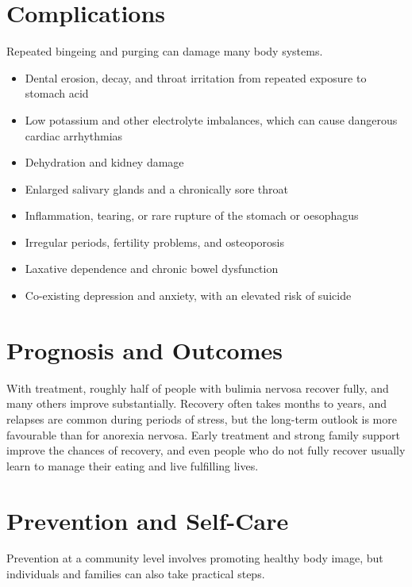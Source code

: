 \section*{Complications}
Repeated bingeing and purging can damage many body systems.

\begin{itemize}
    \item Dental erosion, decay, and throat irritation from repeated exposure to stomach acid
    \item Low potassium and other electrolyte imbalances, which can cause dangerous cardiac arrhythmias
    \item Dehydration and kidney damage
    \item Enlarged salivary glands and a chronically sore throat
    \item Inflammation, tearing, or rare rupture of the stomach or oesophagus
    \item Irregular periods, fertility problems, and osteoporosis
    \item Laxative dependence and chronic bowel dysfunction
    \item Co-existing depression and anxiety, with an elevated risk of suicide
\end{itemize}

\section*{Prognosis and Outcomes}
With treatment, roughly half of people with bulimia nervosa recover fully, and many others improve substantially. Recovery often takes months to years, and relapses are common during periods of stress, but the long-term outlook is more favourable than for anorexia nervosa. Early treatment and strong family support improve the chances of recovery, and even people who do not fully recover usually learn to manage their eating and live fulfilling lives.

\section*{Prevention and Self-Care}
Prevention at a community level involves promoting healthy body image, but individuals and families can also take practical steps.

